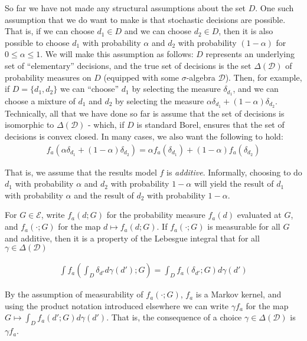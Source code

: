 So far we have not made any structural assumptions about the set $D$. One such assumption that we do want to make is that stochastic decisions are possible. That is, if we can choose $d_1\in D$ and we can choose $d_2 \in D$, then it is also possible to choose $d_1$ with probability $\alpha$ and $d_2$ with probability $(1-\alpha)$ for $0\leq \alpha \leq 1$. We will make this assumption as follows: $D$ represents an underlying set of ``elementary'' decisions, and the true set of decisions is the set $\Delta(\mathcal{D})$ of probability measures on $D$ (equipped with some $\sigma$-algebra $\mathcal{D}$). Then, for example, if $D=\{d_1,d_2\}$ we can ``choose'' $d_1$ by selecting the measure $\delta_{d_1}$, and we can choose a mixture of $d_1$ and $d_2$ by selecting the measure $\alpha \delta_{d_1}+(1-\alpha)\delta_{d_2}$. Technically, all that we have done so far is assume that the set of decisions is isomorphic to $\Delta(\mathcal{D})$ - which, if $D$ is standard Borel, ensures that the set of decisions is convex closed. In many cases, we also want the following to hold:
\begin{align}
	f_a(\alpha\delta_{d_1} + (1-\alpha)\delta_{d_2}) = \alpha f_a(\delta_{d_1}) + (1-\alpha) f_a(\delta_{d_2}) \label{eq:additivity}
\end{align}

That is, we assume that the results model $f$ is \emph{additive}. Informally, choosing to do $d_1$ with probability $\alpha$ and $d_2$ with probability $1-\alpha$ will yield the result of $d_1$ with probability $\alpha$ and the result of $d_2$ with probability $1-\alpha$.

For $G\in \mathcal{E}$, write $f_a(d;G)$ for the probability measure $f_a(d)$ evaluated at $G$, and $f_a(\cdot;G)$ for the map $d\mapsto f_a(d;G)$. If $f_a(\cdot; G)$ is measurable for all $G$ and additive, then it is a property of the Lebesgue integral that for all $\gamma\in \Delta(\mathcal{D})$

\begin{align}
	\int f_a(\int_D \delta_{d'}d\gamma(d') ;G) = \int_D f_a(\delta_{d'};G) d\gamma(d')
\end{align}

By the assumption of measurability of $f_a(\cdot;G)$, $f_a$ is a Markov kernel, and using the product notation introduced elsewhere we can write $\gamma f_a$ for the map $G\mapsto \int_D f_a(d';G) d\gamma(d')$. That is, the consequence of a choice $\gamma\in \Delta(\mathcal{D})$ is $\gamma f_a$.


